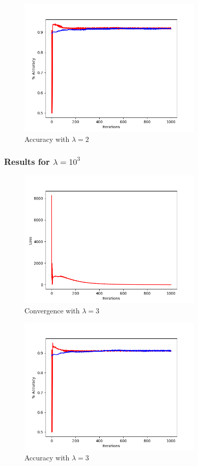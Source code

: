 \documentclass[letterpaper,10pt]{article}
\begin{document}
     \begin{figure}[ht]
    \centering
   \includegraphics[width=250pt]{L2-pos2-gradientLong.png}
     \caption{Accuracy with \(\lambda = 2\)}
    \label{fig:Plot of accuracy over iterations. Red is training data.}
    \end{figure}
\subsubsection{Results for \(\lambda = 10^{3}\)}
     \begin{figure}[ht]
    \centering
   \includegraphics[width=250pt]{L2-pos3-convergence.png}
    \caption{Convergence with \(\lambda = 3\)}
    \label{fig:Convergence of loss function over iterations}
    \end{figure}

     \begin{figure}[ht]
    \centering
   \includegraphics[width=250pt]{L2-pos3-gradientLong.png}
     \caption{Accuracy with \(\lambda = 3\)}
    \label{fig:Plot of accuracy over iterations. Red is training data.}
    \end{figure}
\end{document}
